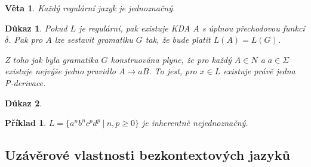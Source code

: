 \documentclass[10pt, a4paper, titlepage]{article}
\theoremstyle{note}
\newtheorem{dukaz}{Důkaz}
\newtheorem{veta}{Věta}
\newtheorem{priklad}{Příklad}
\begin{document}
\begin{veta}
Každý regulární jazyk je jednoznačný.
\end{veta}

\begin{dukaz}
Pokud $L$ je regulární, pak existuje KDA $A$ s úplnou přechodovou funkcí $\delta$. Pak pro $A$ lze sestavit gramatiku $G$ tak, že bude platit $L(A) = L(G)$.

Z toho jak byla gramatika $G$ konstruována plyne, že pro každý $A \in N$ a $a\in\Sigma$ existuje nejvýše jedno pravidlo $A \rightarrow aB$. To jest, pro $x \in L$ existuje právě jedna P-derivace.
\end{dukaz}

\begin{dukaz}

\end{dukaz}

\begin{priklad}
$L=\lbrace a^nb^nc^pd^p\ |\ n,p\ge 0\rbrace$ je inherentně nejednoznačný.
\end{priklad}

\subsection{Uzávěrové vlastnosti bezkontextových jazyků}
\end{document}
